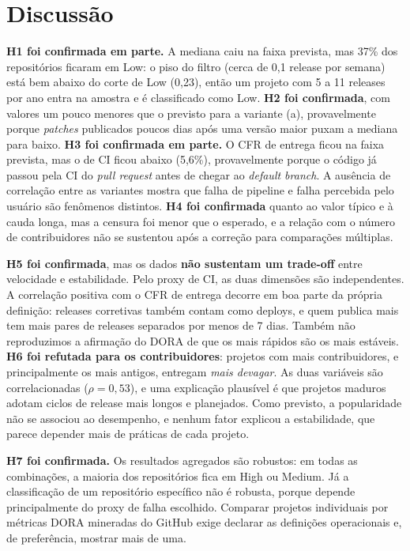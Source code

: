 \documentclass[12pt]{article}
\begin{document}
\section{Discussão}

\textbf{H1 foi confirmada em parte.} A mediana caiu na faixa prevista, mas 37\% dos
repositórios ficaram em Low: o piso do filtro (cerca de 0,1 release por semana) está
bem abaixo do corte de Low (0,23), então um projeto com 5 a 11 releases por ano entra
na amostra e é classificado como Low. \textbf{H2 foi confirmada}, com valores um pouco
menores que o previsto para a variante (a), provavelmente porque \textit{patches}
publicados poucos dias após uma versão maior puxam a mediana para baixo.
\textbf{H3 foi confirmada em parte.} O CFR de entrega ficou na faixa prevista, mas o
de CI ficou abaixo (5,6\%), provavelmente porque o código já passou pela CI do
\textit{pull request} antes de chegar ao \textit{default branch}. A ausência de
correlação entre as variantes mostra que falha de pipeline e falha percebida pelo
usuário são fenômenos distintos. \textbf{H4 foi confirmada} quanto ao valor típico e
à cauda longa, mas a censura foi menor que o esperado, e a relação com o número de
contribuidores não se sustentou após a correção para comparações múltiplas.

\textbf{H5 foi confirmada}, mas os dados \textbf{não sustentam um trade-off} entre
velocidade e estabilidade. Pelo proxy de CI, as duas dimensões são independentes. A
correlação positiva com o CFR de entrega decorre em boa parte da própria definição:
releases corretivas também contam como deploys, e quem publica mais tem mais pares de
releases separados por menos de 7 dias. Também não reproduzimos a afirmação do DORA
de que os mais rápidos são os mais estáveis. \textbf{H6 foi refutada para os
contribuidores}: projetos com mais contribuidores, e principalmente os mais antigos,
entregam \textit{mais devagar}. As duas variáveis são correlacionadas ($\rho = 0{,}53$),
e uma explicação plausível é que projetos maduros adotam ciclos de release mais longos
e planejados. Como previsto, a popularidade não se associou ao desempenho, e nenhum
fator explicou a estabilidade, que parece depender mais de práticas de cada projeto.

\textbf{H7 foi confirmada.} Os resultados agregados são robustos: em todas as
combinações, a maioria dos repositórios fica em High ou Medium. Já a classificação de
um repositório específico não é robusta, porque depende principalmente do proxy de
falha escolhido. Comparar projetos individuais por métricas DORA mineradas do GitHub
exige declarar as definições operacionais e, de preferência, mostrar mais de uma.
\end{document}
